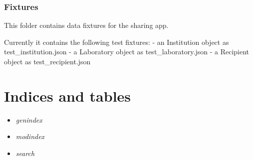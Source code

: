 \documentclass[letterpaper,10pt,english]{sphinxmanual}
\begin{document}
\subsection{Fixtures}
\label{api:id32}\label{api:module-experimentdb.sharing.fixtures}
This folder contains data fixtures for the sharing app.


Currently it contains the following test fixtures:
- an Institution object as test\_institution.json
- a Laboratory object as test\_laboratory.json
- a Recipient object as test\_recipient.json



\chapter{Indices and tables}
\label{index:indices-and-tables}\begin{itemize}
\item {} 
\emph{genindex}


\item {} 
\emph{modindex}


\item {} 
\emph{search}


\end{itemize}
\end{document}
